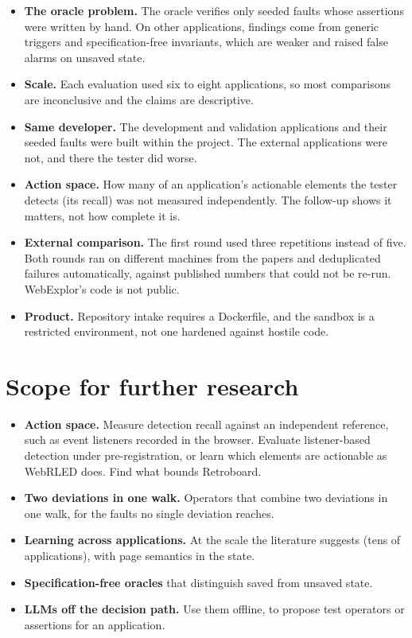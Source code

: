 \begin{itemize}
  \item \textbf{The oracle problem.} The oracle verifies only seeded faults whose assertions
        were written by hand. On other applications, findings come from generic triggers and
        specification-free invariants, which are weaker and raised false alarms on unsaved
        state.
  \item \textbf{Scale.} Each evaluation used six to eight applications, so most comparisons
        are inconclusive and the claims are descriptive.
  \item \textbf{Same developer.} The development and validation applications and their seeded
        faults were built within the project. The external applications were not, and there
        the tester did worse.
  \item \textbf{Action space.} How many of an application's actionable elements the tester
        detects (its recall) was not measured independently. The follow-up shows it matters,
        not how complete it is.
  \item \textbf{External comparison.} The first round used three repetitions instead of
        five. Both rounds ran on different machines from the papers and deduplicated
        failures automatically, against published numbers that could not be re-run.
        WebExplor's code is not public.
  \item \textbf{Product.} Repository intake requires a Dockerfile, and the sandbox is a
        restricted environment, not one hardened against hostile code.
\end{itemize}

\section{Scope for further research}

\begin{itemize}
  \item \textbf{Action space.} Measure detection recall against an independent reference,
        such as event listeners recorded in the browser. Evaluate listener-based detection
        under pre-registration, or learn which elements are actionable as WebRLED does.
        Find what bounds Retroboard.
  \item \textbf{Two deviations in one walk.} Operators that combine two deviations in one
        walk, for the faults no single deviation reaches.
  \item \textbf{Learning across applications.} At the scale the literature suggests (tens of
        applications), with page semantics in the state.
  \item \textbf{Specification-free oracles} that distinguish saved from unsaved state.
  \item \textbf{LLMs off the decision path.} Use them offline, to propose test operators or
        assertions for an application.
\end{itemize}
